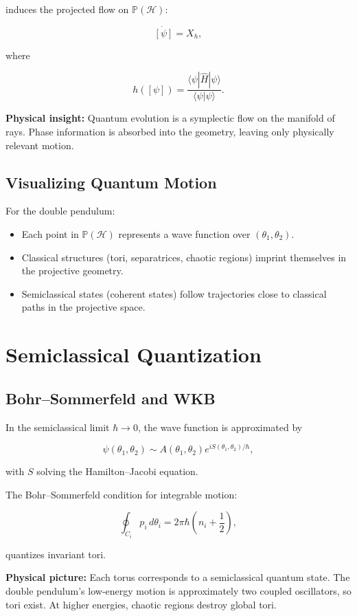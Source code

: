 \documentclass[11pt]{book}
\begin{document}
induces the projected flow on $\mathbb{P}(\mathcal{H})$:

\[
\dot{[\psi]} = X_h,
\]

where

\[
h([\psi]) = \frac{\langle \psi | \hat H | \psi \rangle}{\langle \psi | \psi \rangle}.
\]

\textbf{Physical insight:} Quantum evolution is a symplectic flow on the manifold of rays. Phase information is absorbed into the geometry, leaving only physically relevant motion.

\section{Visualizing Quantum Motion}

For the double pendulum:

\begin{itemize}
    \item Each point in $\mathbb{P}(\mathcal{H})$ represents a wave function over $(\theta_1,\theta_2)$.
    \item Classical structures (tori, separatrices, chaotic regions) imprint themselves in the projective geometry.
    \item Semiclassical states (coherent states) follow trajectories close to classical paths in the projective space.
\end{itemize}


\chapter{Semiclassical Quantization}

\section{Bohr--Sommerfeld and WKB}

In the semiclassical limit $\hbar \to 0$, the wave function is approximated by

\[
\psi(\theta_1,\theta_2) \sim A(\theta_1,\theta_2) e^{i S(\theta_1,\theta_2)/\hbar},
\]

with $S$ solving the Hamilton--Jacobi equation.

The Bohr–Sommerfeld condition for integrable motion:

\[
\oint_{C_i} p_i \, d\theta_i = 2\pi \hbar \left( n_i + \frac{1}{2} \right),
\]

quantizes invariant tori.  

\textbf{Physical picture:} Each torus corresponds to a semiclassical quantum state. The double pendulum's low-energy motion is approximately two coupled oscillators, so tori exist. At higher energies, chaotic regions destroy global tori.
\end{document}
